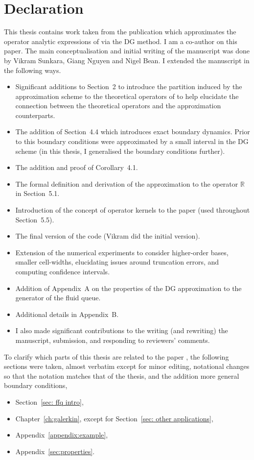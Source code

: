 \chapter{Declaration}
\label{ch:declaration}

This thesis contains work taken from the publication \cite{blnos2022} which approximates the operator analytic expressions of \cite{bo2014} via the DG method. I am a co-author on this paper. The main conceptualisation and initial writing of the manuscript was done by Vikram Sunkara, Giang Nguyen and Nigel Bean. I extended the manuscript in the following ways.
\begin{itemize}
    \item Significant additions to Section~2 to introduce the partition induced by the approximation scheme to the theoretical operators of \cite{bo2014} to help elucidate the connection between the theoretical operators and the approximation counterparts. 
    \item The addition of Section~4.4 which introduces exact boundary dynamics. Prior to this boundary conditions were approximated by a small interval in the DG scheme (in this thesis, I generalised the boundary conditions further).
    \item The addition and proof of Corollary~4.1.
    \item The formal definition and derivation of the approximation to the operator \(\mathbb R\) in Section~5.1. 
    \item Introduction of the concept of operator kernels to the paper (used throughout Section~5.5).
    \item The final version of the code (Vikram did the initial version).
    \item Extension of the numerical experiments to consider higher-order bases, smaller cell-widths, elucidating issues around truncation errors, and computing confidence intervals. 
    \item Addition of Appendix~A on the properties of the DG approximation to the generator of the fluid queue.
    \item Additional details in Appendix~B. 
    \item I also made significant contributions to the writing (and rewriting) the manuscript, submission, and responding to reviewers' comments. 
\end{itemize}
To clarify which parts of this thesis are related to the paper \cite{blnos2022}, the following sections were taken, almost verbatim except for minor editing, notational changes so that the notation matches that of the thesis, and the addition more general boundary conditions,
\begin{itemize}
    \item Section~\ref{sec: ffq intro},
    \item Chapter~\ref{ch:galerkin}, except for Section~\ref{sec: other applications},
    \item Appendix~\ref{appendix:example},
    \item Appendix~\ref{sec:properties}.
\end{itemize}